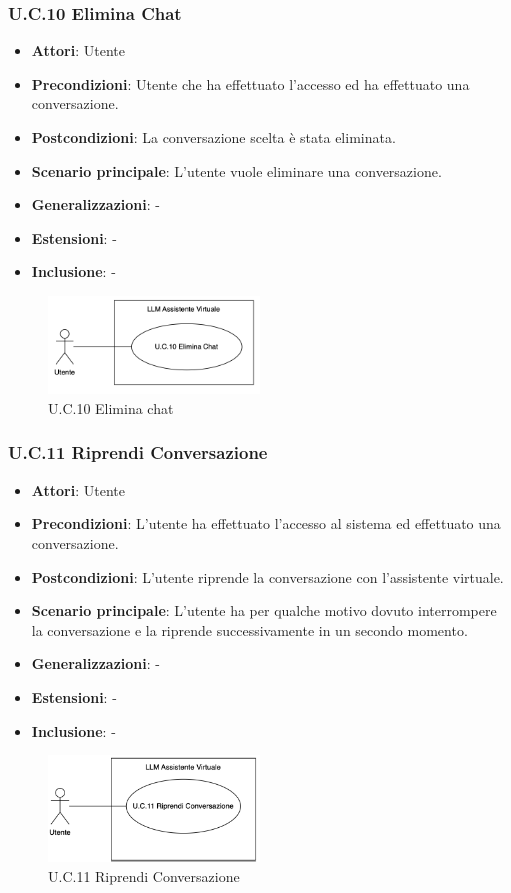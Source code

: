 \subsubsection{U.C.10 Elimina Chat}
\begin{itemize}
    \item \textbf{Attori}: Utente
    \item \textbf{Precondizioni}: Utente che ha effettuato l'accesso ed ha effettuato una conversazione.
    \item \textbf{Postcondizioni}: La conversazione scelta è stata eliminata.
    \item \textbf{Scenario principale}: L'utente vuole eliminare una conversazione.
    \item \textbf{Generalizzazioni}: -
    \item \textbf{Estensioni}: -
    \item \textbf{Inclusione}: -
\end{itemize}
\begin{figure}[h!]
    \centering
    \includegraphics[width=0.5\textwidth]{img/UC10.png}
    \caption{U.C.10 Elimina chat}
\end{figure}
\newpage
\subsubsection{U.C.11 Riprendi Conversazione}
\begin{itemize}
    \item \textbf{Attori}: Utente
    \item \textbf{Precondizioni}: L’utente ha effettuato l’accesso al sistema ed effettuato una conversazione.
    \item \textbf{Postcondizioni}: L’utente riprende la conversazione con l’assistente virtuale.
    \item \textbf{Scenario principale}: L’utente ha per qualche motivo dovuto interrompere la conversazione e la riprende successivamente in un secondo momento.
    \item \textbf{Generalizzazioni}: -
    \item \textbf{Estensioni}: -
    \item \textbf{Inclusione}: -
\end{itemize}
\begin{figure}[h!]
    \centering
    \includegraphics[width=0.5\textwidth]{img/UC11.png}
    \caption{U.C.11 Riprendi Conversazione}
\end{figure}
